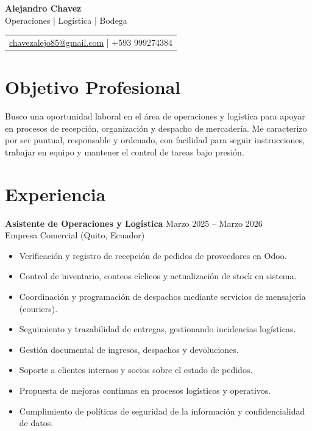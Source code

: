 \documentclass[11pt,a4paper]{article}
\newenvironment{uniformindent}{%
  \begin{list}{}{%
    \setlength{\leftmargin}{2em}
    \setlength{\rightmargin}{0pt}
    \setlength{\topsep}{0pt}
    \setlength{\partopsep}{0pt}
    \setlength{\parsep}{0pt}
    \setlength{\itemsep}{0pt}
  }
  \item[]
}{%
  \end{list}
}
\begin{document}
\begin{center}
    {\LARGE \textbf{Alejandro Chavez}} \\[0.15cm]
    Operaciones | Log\'istica | Bodega \\[0.2cm]
    \begin{tabular}{@{} c @{}}
        \href{mailto:chavezalejo85@gmail.com}{chavezalejo85@gmail.com} \quad | \quad +593 999274384
    \end{tabular}
\end{center}

\begin{uniformindent}

\section*{Objetivo Profesional}
Busco una oportunidad laboral en el \'area de operaciones y log\'istica para apoyar en procesos de recepci\'on, organizaci\'on y despacho de mercader\'ia. Me caracterizo por ser puntual, responsable y ordenado, con facilidad para seguir instrucciones, trabajar en equipo y mantener el control de tareas bajo presi\'on.

\section*{Experiencia}

\textbf{Asistente de Operaciones y Log\'istica} \hfill Marzo 2025 -- Marzo 2026\\
Empresa Comercial (Quito, Ecuador)
\begin{itemize}
    \item Verificaci\'on y registro de recepci\'on de pedidos de proveedores en Odoo.
    \item Control de inventario, conteos c\'iclicos y actualizaci\'on de stock en sistema.
    \item Coordinaci\'on y programaci\'on de despachos mediante servicios de mensajer\'ia (couriers).
    \item Seguimiento y trazabilidad de entregas, gestionando incidencias log\'isticas.
    \item Gesti\'on documental de ingresos, despachos y devoluciones.
    \item Soporte a clientes internos y socios sobre el estado de pedidos.
    \item Propuesta de mejoras continuas en procesos log\'isticos y operativos.
    \item Cumplimiento de pol\'iticas de seguridad de la informaci\'on y confidencialidad de datos.
\end{itemize}


\end{uniformindent}
\end{document}
